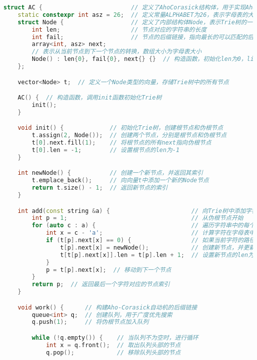 \begin{lstlisting}[language=C++]
struct AC {                         // 定义了AhoCorasick结构体，用于实现Aho-Corasick字符串匹配算法
    static constexpr int asz = 26;  // 定义常量ALPHABET为26，表示字母表的大小（26个小写字母）
    struct Node {                   // 定义了内部结构体Node，表示Trie树的一个节点
        int len;                    // 节点对应的字符串的长度
        int fail;                   // 节点的后缀链接，指向最长的可以匹配的后缀节点
        array<int, asz> next;
        // 表示从当前节点到下一个节点的转换，数组大小为字母表大小
        Node() : len{0}, fail{0}, next{} {}  // 构造函数，初始化len为0，link为0，next数组全为0
    };

    vector<Node> t;  // 定义一个Node类型的向量，存储Trie树中的所有节点

    AC() {  // 构造函数，调用init函数初始化Trie树
        init();
    }

    void init() {             // 初始化Trie树，创建根节点和伪根节点
        t.assign(2, Node());  // 创建两个节点，分别是根节点和伪根节点
        t[0].next.fill(1);    // 将根节点的所有next指向伪根节点
        t[0].len = -1;        // 设置根节点的len为-1
    }

    int newNode() {           // 创建一个新节点，并返回其索引
        t.emplace_back();     // 向向量t中添加一个新的Node节点
        return t.size() - 1;  // 返回新节点的索引
    }

    int add(const string &a) {                       // 向Trie树中添加字符串，并返回最后一个字符对应的节点索引
        int p = 1;                                   // 从伪根节点开始
        for (auto c : a) {                           // 遍历字符串中的每个字符
            int x = c - 'a';                         // 计算字符在字母表中的索引
            if (t[p].next[x] == 0) {                 // 如果当前字符的路径不存在
                t[p].next[x] = newNode();            // 创建新节点，并更新next数组
                t[t[p].next[x]].len = t[p].len + 1;  // 设置新节点的len为当前节点len加1
            }
            p = t[p].next[x];  // 移动到下一个节点
        }
        return p;  // 返回最后一个字符对应的节点索引
    }

    void work() {      // 构建Aho-Corasick自动机的后缀链接
        queue<int> q;  // 创建队列，用于广度优先搜索
        q.push(1);     // 将伪根节点加入队列

        while (!q.empty()) {    // 当队列不为空时，进行循环
            int x = q.front();  // 取出队列头部的节点
            q.pop();            // 移除队列头部的节点


\end{lstlisting}
